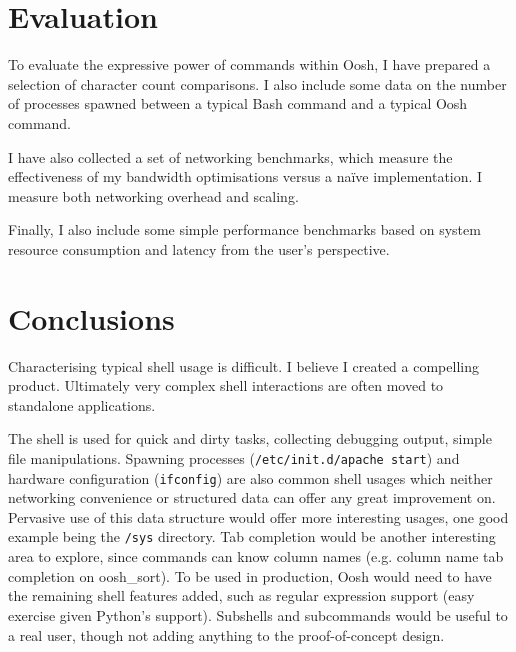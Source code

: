 \documentclass[12pt,twoside,notitlepage]{report}
\begin{document}
\cleardoublepage

\chapter{Evaluation}
To evaluate the expressive power of commands within Oosh, I have prepared a
selection of character count comparisons. I also include some data on the
number of processes spawned between a typical Bash command and a typical Oosh
command.

I have also collected a set of networking benchmarks, which measure the
effectiveness of my bandwidth optimisations versus a na\"{i}ve implementation. I
measure both networking overhead and scaling.

Finally, I also include some simple performance benchmarks based on system
resource consumption and latency from the user's perspective.

\cleardoublepage
\chapter{Conclusions}


Characterising typical shell usage is difficult. I believe I created a
compelling product. Ultimately very complex shell interactions are often moved
to standalone applications. %

The shell is used for quick and dirty tasks, collecting debugging output, simple
file manipulations. Spawning processes ({\tt /etc/init.d/apache start}) and
hardware configuration ({\tt ifconfig}) are also common shell usages which
neither networking convenience or structured data can offer any great
improvement on. Pervasive use of this data structure would offer more
interesting usages, one good example being the {\tt /sys} directory. Tab
completion would be another interesting area to explore, since commands can know
column names (e.g. column name tab completion on oosh\_sort). To be used in
production, Oosh would need to have the remaining shell features added, such as
regular expression support (easy exercise given Python's support). Subshells and
subcommands would be useful to a real user, though not adding anything to the
proof-of-concept design.
\end{document}

